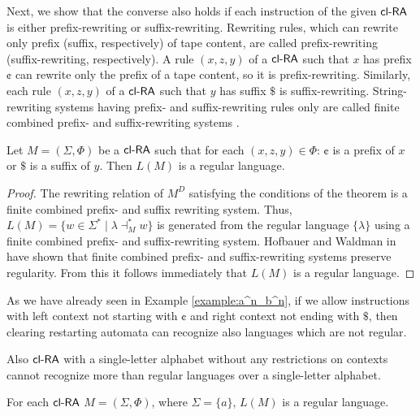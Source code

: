 Next, we show that the converse also holds if each instruction of the given $\textup{\sf cl-RA\/}$ is either prefix-rewriting or suffix-rewriting. Rewriting rules, which can rewrite only prefix (suffix, respectively) of tape content, are called prefix-rewriting (suffix-rewriting, respectively). A rule $(x, z, y)$ of a $\textup{\sf cl-RA\/}$ such that $x$ has prefix $\cent$ can rewrite only the prefix of a tape content, so it is prefix-rewriting. Similarly, each rule $(x, z, y)$ of a $\textup{\sf cl-RA\/}$ such that $y$ has suffix $\$$ is suffix-rewriting. String-rewriting systems having prefix- and suffix-rewriting rules only are called finite combined prefix- and suffix-rewriting systems \citep{Hofbauer2004301}.

\begin{theorem}\label{theorem:clra_to_regular}
Let $M=(\Sigma,\Phi)$ be a $\textup{\sf cl-RA\/}$ such that for each $(x, z, y) \in \Phi$: $\cent$ is a prefix of $x$ or $\$$ is a suffix of $y$. Then $L(M)$ is a regular language.
\end{theorem}

\begin{proof}
The rewriting relation of $M^D$ satisfying the conditions of the theorem is a finite combined prefix- and suffix rewriting system. Thus, $L(M)=\{ w \in \Sigma^* \mid \lambda \dashv_M^* w \}$ is generated from the regular language $\{\lambda\}$ using a finite combined prefix- and suffix-rewriting system. Hofbauer and Waldman in \citep{Hofbauer2004301} have shown that finite combined prefix- and suffix-rewriting systems preserve regularity. From this it follows immediately that $L(M)$ is a regular language.
\end{proof}

As we have already seen in Example \ref{example:a^n_b^n}, if we allow instructions with left context not starting with $\cent$ and right context not ending with $\$$, then clearing restarting automata can recognize also languages which are not regular.

Also $\textup{\sf cl-RA\/}$ with a single-letter alphabet without any restrictions on contexts cannot recognize more than regular languages over a single-letter alphabet.

\begin{lemma}
For each $\textup{\sf cl-RA\/}$ $M = (\Sigma, \Phi)$, where $\Sigma = \{a\}$, $L(M)$ is a regular language.
\end{lemma}

